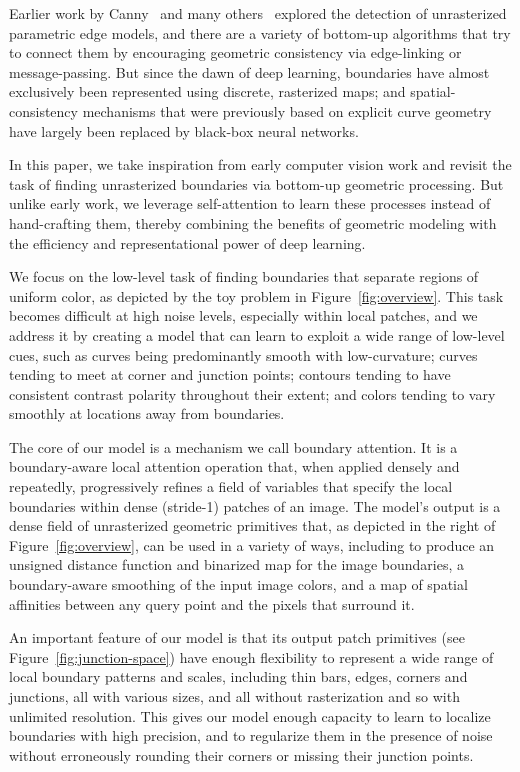 \documentclass[main.tex]{subfiles}
\begin{document}
Earlier work by Canny~\cite{canny1986computational} and many others~\cite{concetta1988feature,parent1989trace,freeman1991design,freeman1992steerable,martin2004learning} explored the detection of unrasterized parametric edge models, and there are a variety of bottom-up algorithms that try to connect them by encouraging geometric consistency via edge-linking or message-passing. But since the dawn of deep learning, boundaries have almost exclusively been represented using discrete, rasterized maps; and spatial-consistency mechanisms that were previously based on explicit curve geometry have largely been replaced by black-box neural networks. 

In this paper, we take inspiration from early computer vision work and revisit the task of finding unrasterized boundaries via bottom-up geometric processing. But unlike early work, we leverage self-attention to learn these processes instead of hand-crafting them, thereby combining the benefits of geometric modeling with the efficiency and representational power of deep learning.

We focus on the low-level task of finding boundaries that separate regions of uniform color, as depicted by the toy problem in Figure~\ref{fig:overview}. This task becomes difficult at high noise levels, especially within local patches, and we address it by creating a model that can learn to exploit a wide range of low-level cues, such as curves being predominantly smooth with low-curvature; curves tending to meet at corner and junction points; contours tending to have consistent contrast polarity throughout their extent; and colors tending to vary smoothly at locations away from boundaries.

The core of our model is a mechanism we call boundary attention. It is a boundary-aware local attention operation that, when applied densely and repeatedly, progressively refines a field of variables that specify the local boundaries within dense (stride-1) patches of an image. The model's output is a dense field of unrasterized geometric primitives that, as depicted in the right of Figure~\ref{fig:overview}, can be used in a variety of ways, including to produce an unsigned distance function and binarized map for the image boundaries, a boundary-aware smoothing of the input image colors, and a map of spatial affinities between any query point and the pixels that surround it.

An important feature of our model is that its output patch primitives (see Figure~\ref{fig:junction-space}) have enough flexibility to represent a wide range of local boundary patterns and scales, including thin bars, edges, corners and junctions, all with various sizes, and all without rasterization and so with unlimited resolution. This gives our model enough capacity to learn to localize boundaries with high precision, and to regularize them in the presence of noise without erroneously rounding their corners or missing their junction points.
\end{document}
